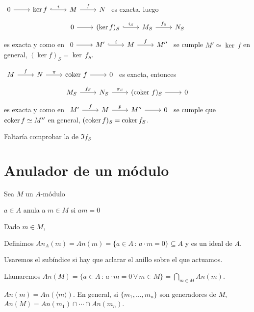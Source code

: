 \begin{dem}
    $\bt 0\arrow{r} & \ker  f \arrow[hook]{r}{i}  & M \arrow{r}{f} & N\et$ es exacta, luego 
    $$\bt 0\arrow{r} & (\ker  f)_S \arrow[hook]{r}{i_S}  & M_S \arrow{r}{f_S} & N_S\et$$ es exacta y como en 
    $\bt 0\arrow{r} & M' \arrow[hook]{r}{i}  & M \arrow{r}{f} & M''\et$ se cumple $M'\simeq \ker\, f$ en general, 
    $(\ker f)_S = \ker\, f_S$.

    $\bt M \arrow{r}{f} & N \arrow{r}{\pi} & \coker\, f \arrow{r} & 0 \et$ es exacta, entonces 
    $$\bt M_S \arrow{r}{f_S} & N_S \arrow{r}{\pi_S} & (\coker\, f)_S \arrow{r} & 0 \et$$ es exacta y como en $\bt M' \arrow{r}{f}  & M \arrow{r}{p} & M''\arrow{r} & 0 \et$  se cumple que $\operatorname{coker} f \simeq M''$ en general, $(\operatorname{coker} f)_S=\operatorname{coker} f_S$. 

    Faltaría comprobar la de $\Im f_S$
\end{dem}
\section{Anulador de un m\'odulo}
Sea $M$ un $A$-m\'odulo
\begin{defi}
    $a\in A$ anula a $m \in M$ si $am=0$
\end{defi}
Dado $m \in M$, 
\begin{defi}
    Definimos $An_A(m) = An(m) = \{ a\in A \, : \, a\cdot m=0\} \subseteq A$ y es un ideal de $A$. 
\end{defi}
Usaremos el sub\'indice si hay que aclarar el anillo sobre el que actuamos.
\begin{defi}
    Llamaremos $\displaystyle An(M) = \{a\in A \, : \, a\cdot m=0\, \forall \, m \in M \} = \bigcap_{m\in M} An(m)$.
\end{defi}
\begin{prop}
    $An(m)=An(\langle m \rangle)$. En general, si $\{m_1, \ldots, m_n\}$ son generadores de $M$, $An(M) = An(m_1)\cap \cdots \cap An(m_n)$. 
\end{prop}

